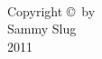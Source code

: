 \documentclass[11pt,oneside,a4paper,onecolumn]{article}                 %
\begin{document}
\pagebreak[4]



\thispagestyle{empty} %
\doublespacing
\begin{center}
\ \\
\ \\
\ \\
\ \\
\ \\
\ \\
\ \\
\ \\
\ \\
\ \\
\ \\
Copyright \copyright\ by\\
Sammy Slug\\
2011
\pagebreak[4]
\end{center}


\renewcommand\contentsname{Table of Contents} %
\tableofcontents %
\pagebreak[4]



\listoffigures %
\pagebreak[4]

\end{document}
